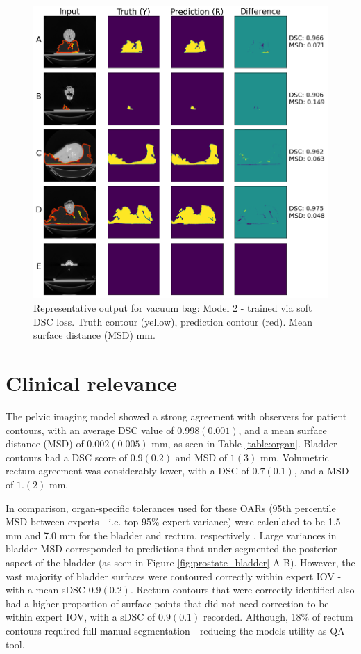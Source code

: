\begin{figure}[H]
	\begin{center}
		\includegraphics[width=1.0\textwidth]{figures/vet_vacbag}
		\caption{Representative output for vacuum bag: Model 2 - trained via soft
      DSC loss. Truth contour (yellow), prediction contour (red). Mean surface
      distance (MSD) mm.}
		\label{fig:vet_vacbag}
	\end{center}
\end{figure}

\section{Clinical relevance}
The pelvic imaging model showed a strong agreement with observers for patient
contours, with an average DSC value of $0.998(0.001)$, and a mean surface
distance (MSD) of $0.002(0.005)$ mm, as seen in Table \ref{table:organ}. Bladder
contours had a DSC score of $0.9(0.2)$ and MSD of $1(3)$ mm. Volumetric rectum
agreement was considerably lower, with a DSC of $0.7(0.1)$, and a MSD of $1.(2)$ 
mm.

In comparison, organ-specific tolerances used for these OARs (95th percentile
MSD between experts - i.e. top 95\% expert variance) were calculated to be 1.5
mm and 7.0 mm for the bladder and rectum, respectively \cite{Roach_2019,
Nikolov_2018}. Large variances in bladder MSD corresponded to predictions that
under-segmented the posterior aspect of the bladder (as seen in Figure
\ref{fig:prostate_bladder} A-B). However, the vast majority of bladder surfaces
were contoured correctly within expert IOV - with a mean sDSC $0.9(0.2)$.
Rectum contours that were correctly identified also had a 
higher proportion of surface points that did not need correction to be within expert
IOV, with a sDSC of $0.9(0.1)$ recorded. Although, 18\% of rectum contours
required full-manual segmentation - reducing the models utility as QA tool.

